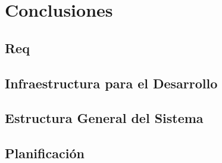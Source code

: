 \chapter{Conclusiones}
\label{Chapter5}

\section{Req}

\section{Infraestructura para el Desarrollo}

\section{Estructura General del Sistema}

\section{{Planificación}}
